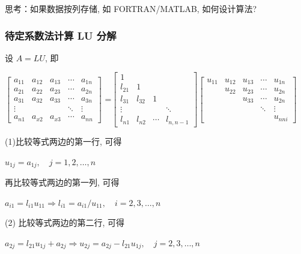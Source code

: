 \documentclass[12pt,a4paper]{article}
\begin{document}
\begin{framed}	
思考：如果数据按列存储, 如 FORTRAN/MATLAB, 如何设计算法?	
\end{framed}

\subsubsection{待定系数法计算 LU 分解}

设 $A = LU$, 即

{$\left[\begin{array}{ccccc}{a_{11}} & {a_{12}} & {a_{13}} & {\cdots} & {a_{1 n}} \\ {a_{21}} & {a_{22}} & {a_{23}} & {\cdots} & {a_{2 n}} \\ {a_{31}} & {a_{32}} & {a_{33}} & {\cdots} & {a_{3 n}} \\ {\vdots} & {} & {} & {\ddots} & {\vdots} \\ {a_{n 1}} & {a_{x 2}} & {a_{x 3}} & {\cdots} & {a_{n n}}\end{array}\right]$ =$\left[\begin{array}{cccc}{1} & {} & {} & {} \\ {l_{21}} & {1} & {} & {} \\ {l_{31}} & {l_{32}} & {1} & {} \\ {\vdots} & {} & {} & {\ddots} \\ {l_{n 1}} & {l_{n 2}} & {\cdots} & {l_{n, n-1}}\end{array}\right]$$ \left[\begin{array}{ccccc}{u_{11}} & {u_{12}} & {u_{13}} & {\cdots} & {u_{1 n}} \\ {} & {u_{22}} & {u_{23}} & {\cdots} & {u_{2 n}} \\ {} & {} & {u_{33}} & {\cdots} & {u_{2 n}} \\ {} & {} & {} & {\ddots} & {\vdots} \\ {} & {} & {} & {} & {u_{n n i}}\end{array}\right] $}

\noindent(1)比较等式两边的第一行, 可得

$u_{1 j}=a_{1 j}, \quad j=1,2, \dots, n$

再比较等式两边的第一列, 可得

$a_{i 1}=l_{i 1} u_{11} \Rightarrow l_{i 1}=a_{i 1} / u_{11}, \quad i=2,3, \ldots, n$

\noindent(2) 比较等式两边的第二行, 可得

$a_{2 j}=l_{21} u_{1 j}+a_{2 j} \Rightarrow u_{2 j}=a_{2 j}-l_{21} u_{1 j}, \quad j=2,3, \ldots, n$
\end{document}
